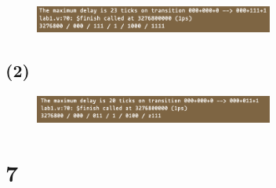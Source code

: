 \documentclass{article}
\begin{document}
\begin{figure}[H]
    \centering
    \includegraphics[width=0.7\textwidth]{6_(1).png}
\end{figure}

\subsection*{(2)}

\begin{figure}[H]
    \centering
    \includegraphics[width=0.7\textwidth]{6_(2).png}
\end{figure}

\section*{7}
\end{document}
